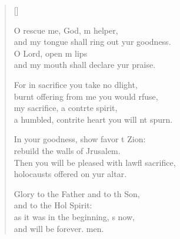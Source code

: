 \begin{verse}[\versewidth]
\begin{patverse}
O rescue me, God, m helper,\Med\\
and my tongue shall ring out yur goodness.\\
O Lord, open m lips\Med\\
and my mouth shall declare yur praise.

For in sacrifice you take no dlight,\Med\\
burnt offering from me you would rfuse,\\
my sacrifice, a contr\pointup{\i}te spirit,\Med\\
a humbled, contrite heart you will nt spurn.

In your goodness, show favor t Zion:\Med\\
rebuild the walls of Jrusalem.\\
Then you will be pleased with lawfl sacrifice,\Med\\
holocausts offered on yur altar.

Glory to the Father and to th Son,\Med\\
and to the Hol Spirit:\\
as it was in the beginning, \pointup{\i}s now,\Med\\
and will be forever. men.
  \end{patverse}
\end{verse}
